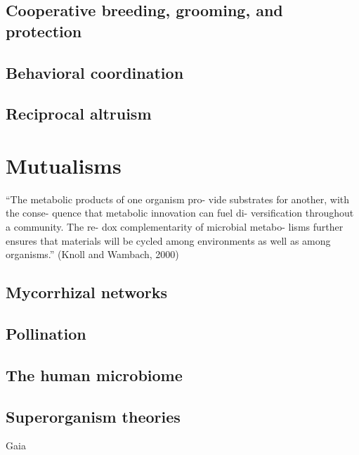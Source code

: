 \documentclass{tufte-book} %
\begin{document}
\section{Cooperative breeding, grooming, and protection}\label{coop-breeding}

\section{Behavioral coordination}\label{coordination}

\section{Reciprocal altruism}\label{reciprocity}



\chapter{Mutualisms}\label{mutualism}

“The metabolic products of one organism pro- vide substrates for another, with the conse- quence that metabolic innovation can fuel di- versification throughout a community. The re- dox complementarity of microbial metabo- lisms further ensures that materials will be cycled among environments as well as among organisms.” (Knoll and Wambach, 2000)


\section{Mycorrhizal networks}

\section{Pollination}

\section{The human microbiome}

\section{Superorganism theories}

Gaia
\end{document}
